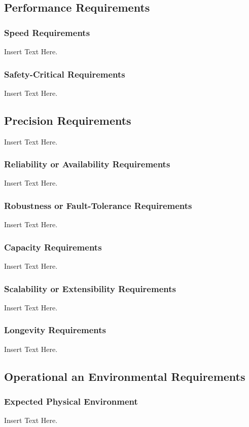 \documentclass [12pt]{article}
\begin{document}
\subsection{Performance Requirements}
\subsubsection{Speed Requirements }
Insert Text Here. 

\subsubsection{Safety-Critical Requirements }
		Insert Text Here. 	

\subsection{Precision Requirements}
		Insert Text Here.

\subsubsection{Reliability or Availability  Requirements}
		Insert Text Here.

\subsubsection{Robustness or Fault-Tolerance Requirements }

		Insert Text Here.
\subsubsection{Capacity Requirements }
		Insert Text Here.

\subsubsection{Scalability or Extensibility Requirements }
		Insert Text Here. 
		
\subsubsection{Longevity Requirements }
		Insert Text Here.

\subsection{Operational an Environmental Requirements}
\subsubsection{Expected Physical Environment }
		Insert Text Here.
		
\end{document}
